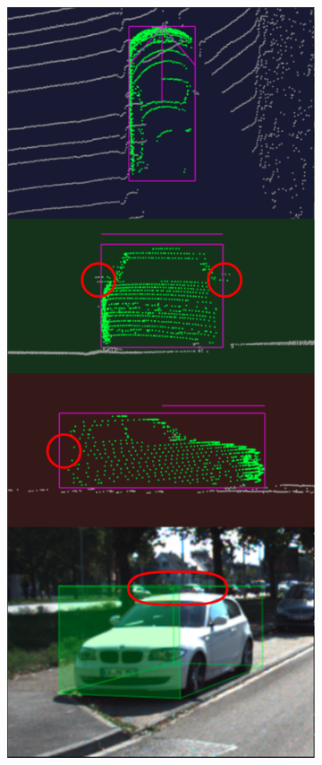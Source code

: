 \documentclass[letterpaper, 10 pt, conference]{ieeeconf}  %
\begin{document}
\begin{figure}
	\centering
	\begin{subfigure}{0.3\linewidth}
		\includegraphics[scale=0.2]{./figures/annocheck}
	\end{subfigure}

\end{figure}
\end{document}
